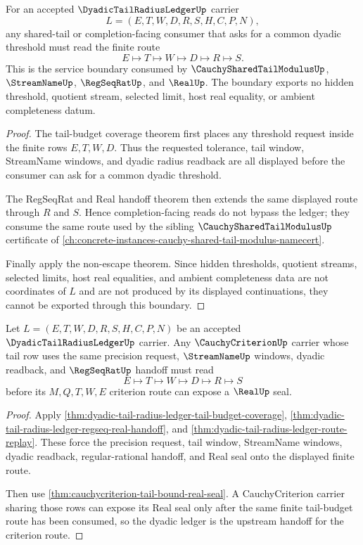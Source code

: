 \begin{theorem}
\label{thm:dyadic-tail-radius-ledger-shared-tail-service-boundary}
For an accepted $\DyadicTailRadiusLedgerUp$ carrier
$$
L=(E,T,W,D,R,S,H,C,P,N),
$$
any shared-tail or completion-facing consumer that asks for a common dyadic threshold must read the finite route
$$
E \longmapsto T \longmapsto W \longmapsto D \longmapsto R \longmapsto S.
$$
This is the service boundary consumed by $\CauchySharedTailModulusUp$, $\StreamNameUp$, $\RegSeqRatUp$, and $\RealUp$. The boundary exports no hidden threshold, quotient stream, selected limit, host real equality, or ambient completeness datum.
\end{theorem}
\begin{proof}
The tail-budget coverage theorem first places any threshold request inside the finite rows $E,T,W,D$. Thus the requested tolerance, tail window, StreamName windows, and dyadic radius readback are all displayed before the consumer can ask for a common dyadic threshold.

The RegSeqRat and Real handoff theorem then extends the same displayed route through $R$ and $S$. Hence completion-facing reads do not bypass the ledger; they consume the same route used by the sibling $\CauchySharedTailModulusUp$ certificate of \autoref{ch:concrete-instances-cauchy-shared-tail-modulus-namecert}.

Finally apply the non-escape theorem. Since hidden thresholds, quotient streams, selected limits, host real equalities, and ambient completeness data are not coordinates of $L$ and are not produced by its displayed continuations, they cannot be exported through this boundary.
\end{proof}

\begin{theorem}
\label{thm:dyadic-tail-radius-ledger-cauchycriterion-handoff}
Let $L=(E,T,W,D,R,S,H,C,P,N)$ be an accepted $\DyadicTailRadiusLedgerUp$ carrier. Any $\CauchyCriterionUp$ carrier whose tail row uses the same precision request, $\StreamNameUp$ windows, dyadic readback, and $\RegSeqRatUp$ handoff must read
$$
E \longmapsto T \longmapsto W \longmapsto D \longmapsto R \longmapsto S
$$
before its $M,Q,T,W,E$ criterion route can expose a $\RealUp$ seal.
\end{theorem}
\begin{proof}
Apply \autoref{thm:dyadic-tail-radius-ledger-tail-budget-coverage}, \autoref{thm:dyadic-tail-radius-ledger-regseq-real-handoff}, and \autoref{thm:dyadic-tail-radius-ledger-route-replay}. These force the precision request, tail window, StreamName windows, dyadic readback, regular-rational handoff, and Real seal onto the displayed finite route.

Then use \autoref{thm:cauchycriterion-tail-bound-real-seal}. A CauchyCriterion carrier sharing those rows can expose its Real seal only after the same finite tail-budget route has been consumed, so the dyadic ledger is the upstream handoff for the criterion route.
\end{proof}

